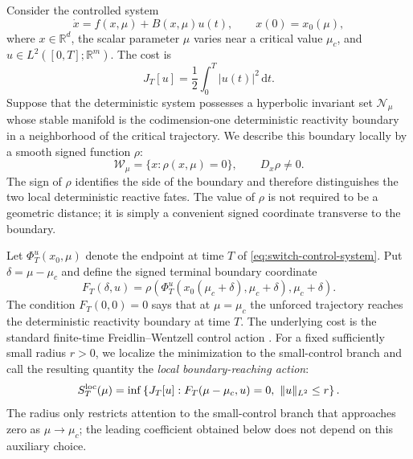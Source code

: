 \documentclass[11pt]{article}
\theoremstyle{definition}
\theoremstyle{remark}
\newcommand{\R}{\mathbb{R}}
\newcommand{\dd}{\mathrm{d}}
\begin{document}
Consider the controlled system
\begin{equation}
\dot x=f(x,\mu)+B(x,\mu)u(t),
\qquad
x(0)=x_0(\mu),
\label{eq:switch-control-system}
\end{equation}
where $x\in\R^d$, the scalar parameter $\mu$ varies near a critical value $\mu_c$, and $u\in L^2([0,T];\R^m)$.  The cost is
\begin{equation}
J_T[u]=\frac12\int_0^T |u(t)|^2\,\dd t.
\label{eq:switch-cost}
\end{equation}
Suppose that the deterministic system possesses a hyperbolic invariant set $\mathcal N_\mu$ whose stable manifold is the codimension-one deterministic reactivity boundary in a neighborhood of the critical trajectory.  We describe this boundary locally by a smooth signed function $\rho$:
\begin{equation}
\mathcal W_\mu=\{x:\rho(x,\mu)=0\},
\qquad D_x\rho\ne0.
\label{eq:stable-level-set}
\end{equation}
The sign of $\rho$ identifies the side of the boundary and therefore distinguishes the two local deterministic reactive fates.  The value of $\rho$ is not required to be a geometric distance; it is simply a convenient signed coordinate transverse to the boundary.

Let $\Phi_T^u(x_0,\mu)$ denote the endpoint at time $T$ of \eqref{eq:switch-control-system}.  Put $\delta=\mu-\mu_c$ and define the signed terminal boundary coordinate
\begin{equation}
F_T(\delta,u)
=
\rho\!\left(\Phi_T^u(x_0(\mu_c+\delta),\mu_c+\delta),\mu_c+\delta\right).
\label{eq:endpoint-function}
\end{equation}
The condition $F_T(0,0)=0$ says that at $\mu=\mu_c$ the unforced trajectory reaches the deterministic reactivity boundary at time $T$.  The underlying cost is the standard finite-time Freidlin--Wentzell control action \cite{FreidlinWentzell2012,ERenVandenEijnden2004}.  For a fixed sufficiently small radius $r>0$, we localize the minimization to the small-control branch and call the resulting quantity the \emph{local boundary-reaching action}:
\begin{equation}
S_T^{\rm loc}(\mu)
=
\inf\left\{
J_T[u]:
F_T(\mu-\mu_c,u)=0,
\ \|u\|_{L^2}\le r
\right\}.
\label{eq:local-boundary-action-def}
\end{equation}
The radius only restricts attention to the small-control branch that approaches zero as $\mu\to\mu_c$; the leading coefficient obtained below does not depend on this auxiliary choice.
\end{document}
